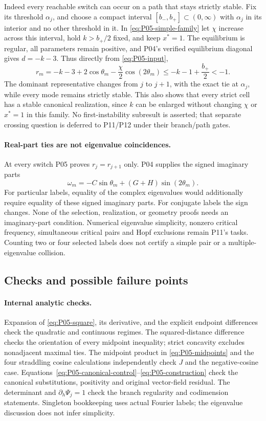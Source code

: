 Indeed every reachable switch can occur on a path that stays strictly
stable. Fix its threshold $\alpha_j$, and choose a compact interval
$[b_-,b_+]\subset(0,\infty)$ with $\alpha_j$ in its interior and no
other threshold in it. In \eqref{eq:P05-simple-family} let $\chi$
increase across this interval, hold $k>b_+/2$ fixed, and keep $x^*=1$.
The equilibrium is regular, all parameters remain positive, and P04's
verified equilibrium diagonal gives $d=-k-3$. Thus directly from
\eqref{eq:P05-input},
\begin{equation}
 r_m=-k-3+2\cos\theta_m-\frac\chi2\cos(2\theta_m)
       \le-k-1+\frac{b_+}{2}<-1.
 \label{eq:P05-stable-switch}
\end{equation}
The dominant representative changes from $j$ to $j+1$, with the exact
tie at $\alpha_j$, while every mode remains strictly stable. This also
shows that every strict cell has a stable canonical realization, since
$k$ can be enlarged without changing $\chi$ or $x^*=1$ in this family.
No first-instability subresult is asserted; that separate crossing question
is deferred to P11/P12 under their branch/path gates.

\paragraph{Real-part ties are not eigenvalue coincidences.}
At every switch P05 proves $r_j=r_{j+1}$ only. P04 supplies the signed
imaginary parts
\[
 \omega_m=-C\sin\theta_m+(G+H)\sin(2\theta_m).
\]
For particular labels, equality of the complex eigenvalues would additionally
require equality of these signed imaginary parts. For conjugate labels the
sign changes. None of the selection, realization, or geometry proofs needs
an imaginary-part condition. Numerical eigenvalue simplicity, nonzero
critical frequency, simultaneous critical pairs and Hopf exclusions remain
P11's tasks. Counting two or four selected labels does not certify a simple
pair or a multiple-eigenvalue collision.

\subsection{Checks and possible failure points}

\paragraph{Internal analytic checks.}
Expansion of \eqref{eq:P05-square}, its derivative, and the explicit
endpoint differences check the quadratic and continuous regimes.
The squared-distance difference checks the orientation of every midpoint
inequality; strict concavity excludes nonadjacent maximal ties.
The midpoint product in \eqref{eq:P05-midpoints} and the four straddling
cosine calculations independently check $J$ and the negative-cosine case.
Equations~\eqref{eq:P05-canonical-control}--\eqref{eq:P05-construction}
check the canonical substitutions, positivity and original vector-field
residual. The determinant and $\partial_h\Psi_j=1$ check the branch
regularity and codimension statements. Singleton bookkeeping uses actual
Fourier labels; the eigenvalue discussion does not infer simplicity.

